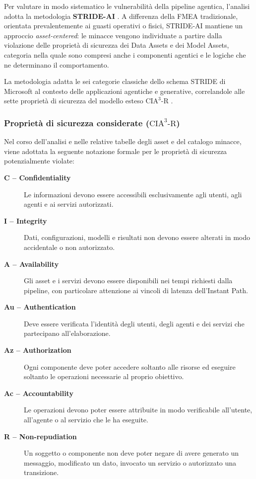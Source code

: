 \documentclass[11pt,a4paper]{article}
\begin{document}
Per valutare in modo sistematico le vulnerabilità della pipeline agentica, l'analisi adotta la metodologia \textbf{STRIDE-AI} \cite{mauri2021strideai,mauri2022stride}. A differenza della FMEA tradizionale, orientata prevalentemente ai guasti operativi o fisici, STRIDE-AI mantiene un approccio \emph{asset-centered}: le minacce vengono individuate a partire dalla violazione delle proprietà di sicurezza dei Data Assets e dei Model Assets, categoria nella quale sono compresi anche i componenti agentici e le logiche che ne determinano il comportamento.

La metodologia adatta le sei categorie classiche dello schema STRIDE di Microsoft al contesto delle applicazioni agentiche e generative, correlandole alle sette proprietà di sicurezza del modello esteso $\text{CIA}^3\text{-R}$ \cite{mauri2022stride}.

\subsubsection*{Proprietà di sicurezza considerate ($\text{CIA}^3\text{-R}$)}

Nel corso dell'analisi e nelle relative tabelle degli asset e del catalogo minacce, viene adottata la seguente notazione formale per le proprietà di sicurezza potenzialmente violate:

\begin{description}
    \item[\textbf{C -- Confidentiality}] Le informazioni devono essere accessibili esclusivamente agli utenti, agli agenti e ai servizi autorizzati.
    \item[\textbf{I -- Integrity}] Dati, configurazioni, modelli e risultati non devono essere alterati in modo accidentale o non autorizzato.
    \item[\textbf{A -- Availability}] Gli asset e i servizi devono essere disponibili nei tempi richiesti dalla pipeline, con particolare attenzione ai vincoli di latenza dell'Instant Path.
    \item[\textbf{Au -- Authentication}] Deve essere verificata l'identità degli utenti, degli agenti e dei servizi che partecipano all'elaborazione.
    \item[\textbf{Az -- Authorization}] Ogni componente deve poter accedere soltanto alle risorse ed eseguire soltanto le operazioni necessarie al proprio obiettivo.
    \item[\textbf{Ac -- Accountability}] Le operazioni devono poter essere attribuite in modo verificabile all'utente, all'agente o al servizio che le ha eseguite.
    \item[\textbf{R -- Non-repudiation}] Un soggetto o componente non deve poter negare di avere generato un messaggio, modificato un dato, invocato un servizio o autorizzato una transizione.
\end{description}
\end{document}
